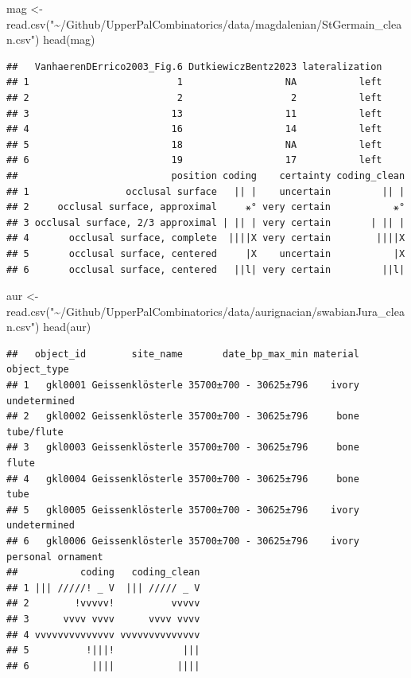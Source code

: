 \documentclass[
]{article}
\newenvironment{Shaded}{\begin{snugshade}}{\end{snugshade}}
\newcommand{\FunctionTok}[1]{\textcolor[rgb]{0.00,0.00,0.00}{#1}}
\newcommand{\NormalTok}[1]{#1}
\newcommand{\OtherTok}[1]{\textcolor[rgb]{0.56,0.35,0.01}{#1}}
\newcommand{\StringTok}[1]{\textcolor[rgb]{0.31,0.60,0.02}{#1}}
\begin{document}
\begin{Shaded}
\begin{Highlighting}[]
\NormalTok{mag }\OtherTok{\textless{}{-}} \FunctionTok{read.csv}\NormalTok{(}\StringTok{"\textasciitilde{}/Github/UpperPalCombinatorics/data/magdalenian/StGermain\_clean.csv"}\NormalTok{)}
\FunctionTok{head}\NormalTok{(mag)}
\end{Highlighting}
\end{Shaded}

\begin{verbatim}
##   VanhaerenDErrico2003_Fig.6 DutkiewiczBentz2023 lateralization
## 1                          1                  NA           left
## 2                          2                   2           left
## 3                         13                  11           left
## 4                         16                  14           left
## 5                         18                  NA           left
## 6                         19                  17           left
##                           position coding    certainty coding_clean
## 1                 occlusal surface   || |    uncertain         || |
## 2     occlusal surface, approximal     ⚹° very certain           ⚹°
## 3 occlusal surface, 2/3 approximal | || | very certain       | || |
## 4       occlusal surface, complete  ||||X very certain        ||||X
## 5       occlusal surface, centered     |X    uncertain           |X
## 6       occlusal surface, centered   ||l| very certain         ||l|
\end{verbatim}

\begin{Shaded}
\begin{Highlighting}[]
\NormalTok{aur }\OtherTok{\textless{}{-}} \FunctionTok{read.csv}\NormalTok{(}\StringTok{"\textasciitilde{}/Github/UpperPalCombinatorics/data/aurignacian/swabianJura\_clean.csv"}\NormalTok{)}
\FunctionTok{head}\NormalTok{(aur)}
\end{Highlighting}
\end{Shaded}

\begin{verbatim}
##   object_id        site_name       date_bp_max_min material       object_type
## 1   gkl0001 Geissenklösterle 35700±700 - 30625±796    ivory      undetermined
## 2   gkl0002 Geissenklösterle 35700±700 - 30625±796     bone        tube/flute
## 3   gkl0003 Geissenklösterle 35700±700 - 30625±796     bone             flute
## 4   gkl0004 Geissenklösterle 35700±700 - 30625±796     bone              tube
## 5   gkl0005 Geissenklösterle 35700±700 - 30625±796    ivory      undetermined
## 6   gkl0006 Geissenklösterle 35700±700 - 30625±796    ivory personal ornament
##           coding   coding_clean
## 1 ||| /////! _ V  ||| ///// _ V
## 2        !vvvvv!          vvvvv
## 3      vvvv vvvv      vvvv vvvv
## 4 vvvvvvvvvvvvvv vvvvvvvvvvvvvv
## 5          !|||!            |||
## 6           ||||           ||||
\end{verbatim}
\end{document}
